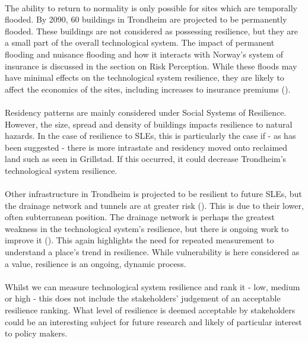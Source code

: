 \paragraph{}
The ability to return to normality is only possible for sites which are temporally flooded. By 2090, 60 buildings in Trondheim are projected to be permanently flooded. These buildings are not considered as possessing resilience, but they are a small part of the overall technological system. The impact of permanent flooding and nuisance flooding and how it interacts with Norway's system of insurance is discussed in the section on Risk Perception. While these floods may have minimal effects on the technological system resilience, they are likely to affect the economics of the sites, including increases to insurance premiums (\cite{cutter_community_2020}). 
\paragraph{}
Residency patterns are mainly considered under Social Systems of Resilience. However, the size, spread and density of buildings impacts resilience to natural hazards. In the case of resilience to SLEs, this is particularly the case if - as has been suggested - there is more intrastate and residency moved onto reclaimed land such as seen in Grillstad. If this occurred, it could decrease Trondheim's technological system resilience.
\paragraph{}
Other infrastructure in Trondheim is projected to be resilient to future SLEs, but the drainage network and tunnels are at greater risk (\cite{hanssen_saksframlegg_2013}). This is due to their lower, often subterranean position. The drainage network is perhaps the greatest weakness in the technological system's resilience, but there is ongoing work to improve it (\cite{hanssen_saksframlegg_2013}). This again highlights the need for repeated measurement to understand a place's trend in resilience. While vulnerability is here considered as a value, resilience is an ongoing, dynamic process.
\paragraph{}
Whilst we can measure technological system resilience and rank it - low, medium or high - this does not include the stakeholders' judgement of an acceptable resilience ranking. What level of resilience is deemed acceptable by stakeholders could be an interesting subject for future research and likely of particular interest to policy makers.

